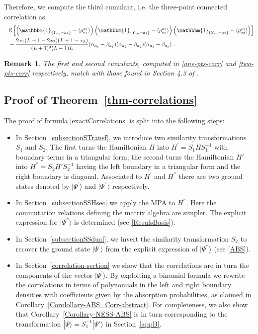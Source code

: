 \documentclass[10pt]{article}
\numberwithin{equation}{section}
\numberwithin{equation}{subsection}
\newtheorem{remark}{Remark}
\newcommand{\dt}{\;.}
\begin{document}
Therefore, we compute the third cumulant, i.e. the three-point connected correlation as 
\begin{align}
	&\mathbb{E}\left[\left(\mathbbm{1}_{\{Y_{x_{1}}=a_{1}\}}-\langle\rho_{a_{1}}^{x_{1}}\rangle \right)\left(\mathbbm{1}_{\{Y_{x_{2}}=a_{2}\}}-\langle\rho_{a_{2}}^{x_{2}}\rangle \right)\left(\mathbbm{1}_{\{Y_{x_{3}}=a_{3}\}}-\langle\rho_{a_{3}}^{x_{3}}\rangle \right)\right]\nonumber\\
	=&-\frac{2x_{1}(L+1-2x_{2})(L+1-x_{3})}{(L+1)^{3}(L-1)L}(\alpha_{a_{1}}-\beta_{a_{1}})(\alpha_{a_{2}}-\beta_{a_{2}})(\alpha_{a_{3}}-\beta_{a_{3}})\dt
\end{align} 
\begin{remark} The first and second cumulants, computed in \eqref{one-pts-corr} and \eqref{two-pts-corr} respectively, match with those found in Section 4.3 of \cite{vanicat2017exact}.
	\end{remark}

\subsection{Proof of Theorem~\ref{thm-correlations}}
The proof of formula \eqref{exactCorrelations} is split into the following steps:
\begin{itemize}
	\item In Section~\ref{subsectionSTransf}, we introduce two similarity transformations $S_1$ and  $S_2$. 
	 The first turns the Hamiltonian $H$ into $H^{'}= S_{1} H S_{1}^{-1} $ with boundary terms in a triangular form;
	 the second  turns the Hamiltonian $H'$ into $H^{''} = S_{2}H' S_{2}^{-1}$ having the left boundary in a triangular form and the right boundary is diagonal.
	Associated to $H^{'}$ and $H^{''}$ there are two ground states denoted by $|\Psi^{'}\rangle$ and $|\Psi^{''}\rangle$ respectively. 
	\item In Section~\ref{subsectionSSHsec} we apply the MPA to $H^{''}$. Here the commutation relations defining the matrix algebra are simpler. The explicit expression for $|\Psi^{''}\rangle$ is determined (see \eqref{ResulsBasis}).
	\item In Section~\ref{subsectionSSdual}, we invert the similarity transformation $S_2$ to recover  the ground state $|\Psi^{'}\rangle$ from the explicit expression of $|\Psi^{''}\rangle$  (see \eqref{ABS}).
	\item In Section~\ref{correlation-section} we show that the correlations are in turn the components of the vector $|\Psi^{'}\rangle$. 
	By exploiting a binomial formula we rewrite the correlations in terms
of polynomials in the left and right boundary densities with coefficients given by the absorption probabilities, as claimed in Corollary~\ref{Corolollary-ABS_Corr-abstract}.
	For completeness, we also show that Corollary~\ref{Corollary-NESS-ABS} is in turn corresponding to the transformation $|\Psi\rangle = S_{1}^{-1} |\Psi'\rangle$ in Section~\ref{appB}. 
	\end{itemize}
\end{document}
